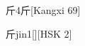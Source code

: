 \begin{entry}{斤}{4}{⽄}[Kangxi 69]
  \begin{phonetics}{斤}{jin1}[][HSK 2]
  \end{phonetics}
\end{entry}
